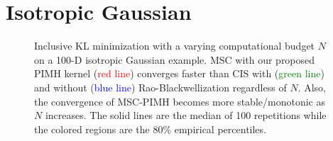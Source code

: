 \section{Isotropic Gaussian}
\begin{figure}
  \centering
  \caption{Inclusive KL minimization with a varying computational budget \(N\) on a 100-D isotropic Gaussian example.
    MSC with our proposed PIMH kernel (\textcolor{red}{red line}) converges faster than CIS with (\textcolor{green}{green line}) and without (\textcolor{blue}{blue line}) Rao-Blackwellization regardless of \(N\).
    Also, the convergence of MSC-PIMH becomes more stable/monotonic as \(N\) increases.
    The solid lines are the median of 100 repetitions while the colored regions are the 80\% empirical percentiles.
  }
\end{figure}

